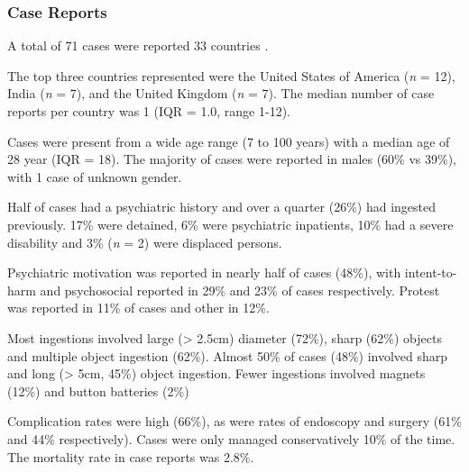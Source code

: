 \subsubsection*{Case Reports}

A total of 71 cases were reported 33 countries \cite{Akay_2015f,Al-Faham_2020k,AlShaaibi_2021b,Alao_2006i,Ali_2017,Ali_2020f,Ali_2022g,Apikotoa_2022f,Ataya_2013,Atayan_2016,Beecroft_1998,Benoist_2019e,Berry_2021e,Bhasin_2014,Bhattacharjee_2008,Bhumi_2024f,CamachoDorado_2018,Cauchi_2002,Chang_2017f,Cox_2007,Csaky_1998e,DelgadoSalazar_2020c,DivsalarP._2023a,Emamhadi_2018,Farhadi_2024h,Fry_2010,Gardner_2017h,Goldman_1998f,Guinan_2019f,Hardy_2023g,Jehangir_2019h,Jin_2023,Kar_2015,Kariholu_2008,Kerestes_2019,Kobiela_2015,Kumar_2001,Kumar_2019f,Li_2013,Liu_2005,Losanoff_1996,Losanoff_1997e,Mesfin_2022a,Misra_2013,Naji_2012f,Ohno_2005,Peixoto_2017f,Qureshi_2016,Riva_2018j,Sakellaridis_2008f,Sobnach_2011f,Sultan_2024f,Tammana_2012j,Tanrikulu_2015e,Tay_2004,Thapa_2019f,Trgo_2012f,Wadhwa_2015e,Wildhaber_2005,Wnęk_2015f,Yasin_2009,Yildiz_2016e,fjbuilsRepeatedBehaviorDeliberate2024,teWildt_2010}. 

The top three countries represented were the United States of America (\emph{n} = 12), India (\emph{n} = 7), and the United Kingdom (\emph{n} = 7). The median number of case reports per country was 1 (IQR = 1.0, range 1-12).

Cases were present from a wide age range (7 to 100 years) with a median age of 28 year (IQR = 18). The majority of cases were reported in males (60\% vs 39\%), with 1 case of unknown gender. 

Half of cases had a psychiatric history and over a quarter (26\%) had ingested previously. 17\% were detained, 6\% were psychiatric inpatients, 10\% had a severe disability and 3\% (\emph{n} = 2) were displaced persons.

Psychiatric motivation was reported in nearly half of cases (48\%), with intent-to-harm and psychosocial reported in 29\% and 23\% of cases respectively. Protest was reported in 11\% of cases and other in 12\%.

Most ingestions involved large (\textgreater{} 2.5cm) diameter (72\%), sharp (62\%) objects and multiple object ingestion (62\%). Almost 50\% of cases (48\%) involved sharp and long (\textgreater{} 5cm, 45\%) object ingestion. Fewer ingestions involved magnets (12\%) and button batteries (2\%)

Complication rates were high (66\%), as were rates of endoscopy and surgery (61\% and 44\% respectively). Cases were only managed conservatively 10\% of the time. The mortality rate in case reports was 2.8\%. 

